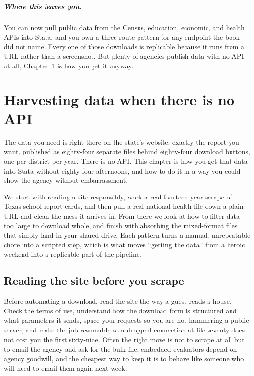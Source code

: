 \documentclass[
    a4paper,
    fontsize=10pt,
    twoside=true,
    numbers=noenddot,
]{kaobook}
\begin{document}
\paragraph{Where this leaves you.} You can now pull public data from the Census, education, economic, and health APIs into Stata, and you own a three-route pattern for any endpoint the book did not name. Every one of those downloads is replicable because it runs from a URL rather than a screenshot. But plenty of agencies publish data with no API at all; Chapter~\ref{ch:noapi} is how you get it anyway.

\chapter{Harvesting data when there is no API}\label{ch:noapi}

The data you need is right there on the state's website: exactly the report you want, published as eighty-four separate files behind eighty-four download buttons, one per district per year. There is no API. This chapter is how you get that data into Stata without eighty-four afternoons, and how to do it in a way you could show the agency without embarrassment.

We start with reading a site responsibly, work a real fourteen-year scrape of Texas school report cards, and then pull a real national health file down a plain URL and clean the mess it arrives in. From there we look at how to filter data too large to download whole, and finish with absorbing the mixed-format files that simply land in your shared drive. Each pattern turns a manual, unrepeatable chore into a scripted step, which is what moves \enquote{getting the data} from a heroic weekend into a replicable part of the pipeline.

\section{Reading the site before you scrape}
Before automating a download, read the site the way a guest reads a house. Check the terms of use, understand how the download form is structured and what parameters it sends, space your requests so you are not hammering a public server, and make the job resumable so a dropped connection at file seventy does not cost you the first sixty-nine. Often the right move is not to scrape at all but to email the agency and ask for the bulk file; embedded evaluators depend on agency goodwill, and the cheapest way to keep it is to behave like someone who will need to email them again next week.
\end{document}

